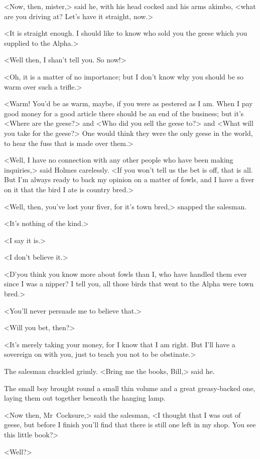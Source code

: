 <Now, then, mister,> said he, with his head cocked and his arms akimbo, <what are you driving at? Let's have it straight, now.>

<It is straight enough. I should like to know who sold you the geese which you supplied to the Alpha.>

<Well then, I shan't tell you. So now!>

<Oh, it is a matter of no importance; but I don't know why you should be so warm over such a trifle.>

<Warm! You'd be as warm, maybe, if you were as pestered as I am. When I pay good money for a good article there should be an end of the business; but it's <Where are the geese?> and <Who did you sell the geese to?> and <What will you take for the geese?> One would think they were the only geese in the world, to hear the fuss that is made over them.>

<Well, I have no connection with any other people who have been making inquiries,> said Holmes carelessly. <If you won't tell us the bet is off, that is all. But I'm always ready to back my opinion on a matter of fowls, and I have a fiver on it that the bird I ate is country bred.>

<Well, then, you've lost your fiver, for it's town bred,> snapped the salesman.

<It's nothing of the kind.>

<I say it is.>

<I don't believe it.>

<D'you think you know more about fowls than I, who have handled them ever since I was a nipper? I tell you, all those birds that went to the Alpha were town bred.>

<You'll never persuade me to believe that.>

<Will you bet, then?>

<It's merely taking your money, for I know that I am right. But I'll have a sovereign on with you, just to teach you not to be obstinate.>

The salesman chuckled grimly. <Bring me the books, Bill,> said he.

The small boy brought round a small thin volume and a great greasy-backed one, laying them out together beneath the hanging lamp.

<Now then, Mr~Cocksure,> said the salesman, <I thought that I was out of geese, but before I finish you'll find that there is still one left in my shop. You see this little book?>

<Well?>

